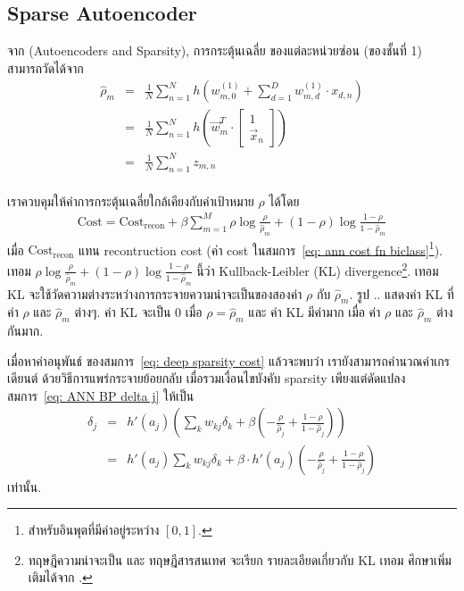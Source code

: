 \subsection{Sparse Autoencoder}

จาก \cite{ufldl} (Autoencoders and Sparsity), การกระตุ้นเฉลี่ย ของแต่ละหน่วยซ่อน (ของชั้นที่ 1) สามารถวัดได้จาก
\begin{eqnarray}
 \hat{\rho}_m &=& \frac{1}{N} \sum_{n=1}^N h \left( 
w^{(1)}_{m,0} + \sum_{d=1}^D w^{(1)}_{m,d} \cdot x_{d,n} \right)
 \nonumber \\ 
&=& \frac{1}{N} \sum_{n=1}^N h \left( 
 \vec{w}^T_m
  \cdot \begin{bmatrix}
 1 \\
 \vec{x}_n
 \end{bmatrix} \right)
 \nonumber \\ 
&=& \frac{1}{N} \sum_{n=1}^N z_{m,n}
 \nonumber \\  
\label{eq: deep sparse rhohat} 
\end{eqnarray}

เราควบคุมให้ค่าการกระตุ้นเฉลี่ยใกล้เคียงกับค่าเป้าหมาย $\rho$ ได้โดย
\begin{eqnarray}
 \mathrm{Cost} = \mathrm{Cost}_{\mathrm{recon}} 
  + \beta \sum_{m=1}^M \rho \log \frac{\rho}{\hat{\rho}_m} + (1 - \rho) \log \frac{1 - \rho}{1 - \hat{\rho}_m}
\label{eq: deep sparsity cost}  
\end{eqnarray}
เมื่อ $\mathrm{Cost}_{\mathrm{recon}}$ แทน recontruction cost (ค่า cost ในสมการ~\ref{eq: ann cost fn biclass}\footnote{สำหรับอินพุตที่มีค่าอยู่ระหว่าง $[0,1]$.}).
เทอม $\rho \log \frac{\rho}{\hat{\rho}_m} + (1 - \rho) \log \frac{1 - \rho}{1 - \hat{\rho}_m}$ นี้ว่า Kullback-Leibler (KL) divergence\footnote{ทฤษฎีความน่าจะเป็น และ ทฤษฎีสารสนเทศ จะเรียก 
รายละเอียดเกี่ยวกับ KL เทอม ศึกษาเพิ่มเติมได้จาก \cite{KullbackLeibler1951a}.
}.
เทอม KL จะใช้วัดความต่างระหว่างการกระจายความน่าจะเป็นของสองค่า $\rho$ กับ $\hat{\rho}_m$.
รูป .. แสดงค่า KL ที่ค่า $\rho$ และ $\hat{\rho}_m$ ต่างๆ. 
ค่า KL จะเป็น $0$ เมื่อ $\rho = \hat{\rho}_m$ และ ค่า KL มีค่ามาก เมื่อ ค่า $\rho$ และ $\hat{\rho}_m$ ต่างกันมาก.

เมื่อหาค่าอนุพันธ์ ของสมการ~\ref{eq: deep sparsity cost} 
แล้วจะพบว่า เรายังสามารถคำนวณค่าเกรเดียนต์ ด้วยวิธีการแพร่กระจายย้อยกลับ
เมื่อรวมเงื่อนไขบังคับ sparsity เพียงแต่ดัดแปลง สมการ~\ref{eq: ANN BP delta j} ให้เป็น
\begin{eqnarray}
  \delta_j &=& h'(a_j) \left( \sum_k w_{kj} \delta_k + \beta \left( -\frac{\rho}{\hat{\rho}_j} + \frac{1 - \rho}{1 - \hat{\rho}_j} \right) \right)
\nonumber \\
&=& h'(a_j) \sum_k w_{kj} \delta_k + \beta \cdot h'(a_j) \left( -\frac{\rho}{\hat{\rho}_j} + \frac{1 - \rho}{1 - \hat{\rho}_j} \right)
\label{eq: deep BP delta j sparsity}
\end{eqnarray}
เท่านั้น.
% 


